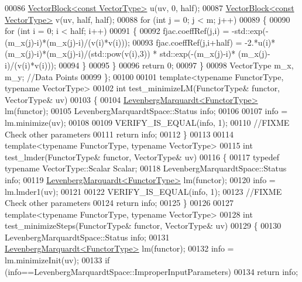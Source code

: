 \begin{DoxyCode}
00086     \hyperlink{group___core___module_class_eigen_1_1_vector_block}{VectorBlock<const VectorType>} u(uv, 0, half);
00087     \hyperlink{group___core___module_class_eigen_1_1_vector_block}{VectorBlock<const VectorType>} v(uv, half, half);
00088     \textcolor{keywordflow}{for} (\textcolor{keywordtype}{int} j = 0; j < m; j++)
00089     \{
00090       \textcolor{keywordflow}{for} (\textcolor{keywordtype}{int} i = 0; i < half; i++)
00091       \{
00092         fjac.coeffRef(j,i) = -std::exp(-(m\_x(j)-i)*(m\_x(j)-i)/(v(i)*v(i)));
00093         fjac.coeffRef(j,i+half) = -2.*u(i)*(m\_x(j)-i)*(m\_x(j)-i)/(std::pow(v(i),3)) * std::exp(-(m\_x(j)-i)*
      (m\_x(j)-i)/(v(i)*v(i)));
00094       \}
00095     \}
00096     \textcolor{keywordflow}{return} 0;
00097   \}
00098   VectorType m\_x, m\_y; \textcolor{comment}{//Data Points}
00099 \};
00100 
00101 \textcolor{keyword}{template}<\textcolor{keyword}{typename} FunctorType, \textcolor{keyword}{typename} VectorType>
00102 \textcolor{keywordtype}{int} test\_minimizeLM(FunctorType& functor, VectorType& uv)
00103 \{
00104   \hyperlink{class_eigen_1_1_levenberg_marquardt}{LevenbergMarquardt<FunctorType>} lm(functor);
00105   LevenbergMarquardtSpace::Status info; 
00106   
00107   info = lm.minimize(uv);
00108   
00109   VERIFY\_IS\_EQUAL(info, 1);
00110   \textcolor{comment}{//FIXME Check other parameters}
00111   \textcolor{keywordflow}{return} info;
00112 \}
00113 
00114 \textcolor{keyword}{template}<\textcolor{keyword}{typename} FunctorType, \textcolor{keyword}{typename} VectorType>
00115 \textcolor{keywordtype}{int} test\_lmder(FunctorType& functor, VectorType& uv)
00116 \{
00117   \textcolor{keyword}{typedef} \textcolor{keyword}{typename} VectorType::Scalar Scalar;
00118   LevenbergMarquardtSpace::Status info; 
00119   \hyperlink{class_eigen_1_1_levenberg_marquardt}{LevenbergMarquardt<FunctorType>} lm(functor);
00120   info = lm.lmder1(uv);
00121   
00122   VERIFY\_IS\_EQUAL(info, 1);
00123   \textcolor{comment}{//FIXME Check other parameters}
00124   \textcolor{keywordflow}{return} info;
00125 \}
00126 
00127 \textcolor{keyword}{template}<\textcolor{keyword}{typename} FunctorType, \textcolor{keyword}{typename} VectorType>
00128 \textcolor{keywordtype}{int} test\_minimizeSteps(FunctorType& functor, VectorType& uv)
00129 \{
00130   LevenbergMarquardtSpace::Status info;   
00131   \hyperlink{class_eigen_1_1_levenberg_marquardt}{LevenbergMarquardt<FunctorType>} lm(functor);
00132   info = lm.minimizeInit(uv);
00133   \textcolor{keywordflow}{if} (info==LevenbergMarquardtSpace::ImproperInputParameters)
00134       \textcolor{keywordflow}{return} info;

\end{DoxyCode}
